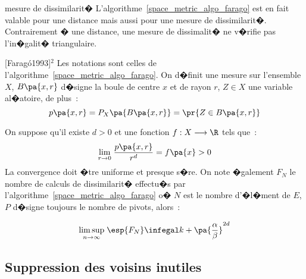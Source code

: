 \begin{xremark}{mesure de dissimilarit�}
L'algorithme~\ref{space_metric_algo_farago} est en fait valable pour une distance mais aussi pour une mesure de dissimilarit�. Contrairement � une distance, une mesure de dissimalit� ne v�rifie pas l'in�galit� triangulaire.
\end{xremark}


            \begin{xtheorem}{[Farag\'o1993]$^2$}
                                                                \label{space_metric_farago_2}
            Les notations sont celles de l'algorithme~\ref{space_metric_algo_farago}. On d�finit une mesure 
            sur l'ensemble $X$, $B\pa{x,r}$ d�signe la boule de centre $x$ et de rayon $r$, $Z \in X$ une variable 
            al�atoire, de plus~:
                        $$
                        p\pa{x,r} = P_X \pa{B\pa{x,r}} = \pr{  Z \in B\pa{x,r}}
                        $$
                        
            On suppose qu'il existe $d > 0$ et une fonction $f : X \longrightarrow \R$ tels que~:
                        $$
                        \underset { r \rightarrow 0 } { \lim } \; \frac{ p\pa{x,r} } { r^d } = f\pa{x} > 0
                        $$
          La convergence doit �tre uniforme et presque s�re.
          On note �galement $F_N$ le nombre de calculs de dissimilarit� effectu�s par 
          l'algorithme~\ref{space_metric_algo_farago} o� $N$ est le nombre d'�l�ment de $E$, 
          $P$ d�signe toujours le nombre de pivots, alors~:
          
                      $$
                      \underset{ n \rightarrow \infty } { \lim \sup } \;
                                      \esp{F_N} \infegal k + \pa{\frac{\alpha}{\beta}}^{2d}
                      $$
                                                                            
            \end{xtheorem}









\subsection{Suppression des voisins inutiles}
\label{space_metric_suppression_voisins_inutile}

